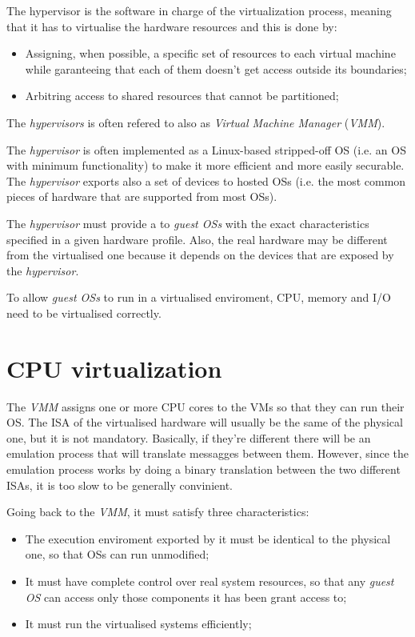 \begin{definition}[Hypervisor]
    The hypervisor is the software in charge of the virtualization process,
    meaning that it has to virtualise the hardware resources and this is done by:
    \begin{itemize}
        \item Assigning, when possible, a specific set of resources to each
        virtual machine while garanteeing that each of them doesn't get access
        outside its boundaries;
        \item Arbitring access to shared resources that cannot be partitioned;
    \end{itemize}
\end{definition}
\begin{note}
    The \emph{hypervisors} is often refered to also as \emph{Virtual Machine
    Manager} (\emph{VMM}).
\end{note}
\noindent
The \emph{hypervisor} is often implemented as a Linux-based stripped-off OS
(i.e. an OS with minimum functionality) to make it more efficient
and more easily securable. The \emph{hypervisor} exports also a set of
 devices to hosted OSs (i.e. the most common pieces of hardware
that are supported from most OSs).

The \emph{hypervisor} must provide a  to \emph{guest
OSs} with the exact characteristics specified in a given hardware profile.
Also, the real hardware may be different from the virtualised one because it
depends on the devices that are exposed by the \emph{hypervisor}.

To allow \emph{guest OSs} to run in a virtualised enviroment, CPU, memory and
I/O need to be virtualised correctly.

\section{CPU virtualization}
The \emph{VMM} assigns one or more CPU cores to the VMs so that they can run
their OS. The ISA of the virtualised hardware will usually be the same
of the physical one, but it is not mandatory. Basically, if they're different
there will be an emulation process that will translate messagges between them.
However, since the emulation process works by doing a binary translation between
the two different ISAs, it is too slow to be generally convinient.

Going back to the \emph{VMM}, it must satisfy three characteristics:
\begin{itemize}
    \item The execution enviroment exported by it must be identical to the
    physical one, so that OSs can run unmodified;
    \item It must have complete control over real system resources, so that
    any \emph{guest OS} can access only those components it has been grant access
    to;
    \item It must run the virtualised systems efficiently;
\end{itemize}

